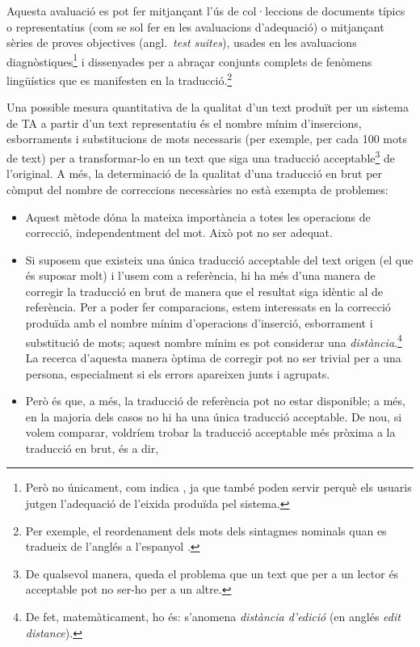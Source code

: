 \begin{enumerate}
\begin{enumerate}
  Aquesta avaluació es pot fer mitjançant
  l'ús de col·leccions de documents típics o representatius 
  (com se sol
  fer en les avaluacions d'adequació) o mitjançant sèries de
  proves objectives (angl.\ \emph{test suites}),   
  usades en les avaluacions diagnòstiques\footnote{Però no
    únicament, com indica  \citet{lewis97j}, ja que també poden
    servir perquè els usuaris jutgen l'adequació de l'eixida
    produïda pel sistema.} i dissenyades per a
  abraçar conjunts complets de fenòmens lingüístics que 
  es manifesten en la traducció.\footnote{Per exemple, el reordenament
  dels mots dels sintagmes nominals quan es tradueix de l'anglés
  a l'espanyol \citep{mira98j,forcada00p}.}

Una possible mesura quantitativa de la qualitat d'un text produït per
un sistema de TA a partir d'un text representatiu és el nombre mínim
d'insercions, esborraments i substitucions de mots necessaris (per
exemple, per cada 100 mots de text) per a transformar-lo en un text
que siga una traducció acceptable\footnote{De qualsevol manera, queda
  el problema que un text que per a un lector és acceptable pot no
  ser-ho per a un altre.} de l'original. A més, la determinació de la
qualitat d'una traducció en brut per còmput del nombre de correccions
necessàries no està exempta de problemes:
\begin{itemize}
\item Aquest mètode dóna la mateixa importància a totes les operacions
  de correcció, independentment del mot. Això pot no ser adequat.
\item Si suposem que existeix una única traducció acceptable del text
  origen (el que és suposar molt) i l'usem com a referència, hi ha més
  d'una manera de corregir la traducció en brut de manera que el
  resultat siga idèntic al de referència. Per a poder fer
  comparacions, estem interessats en la correcció produïda amb el
  nombre mínim d'operacions d'inserció, esborrament i substitució de
  mots; aquest nombre mínim es pot considerar una
  \emph{distància}.\footnote{De fet, matemàticament, ho és: s'anomena
    \emph{distància d'edició} (en anglés \emph{edit distance}).} La
  recerca d'aquesta manera òptima de corregir pot no ser trivial per a
  una persona, especialment si els errors apareixen junts i agrupats.
\item Però és que, a més, la traducció de referència pot no estar
  disponible; a més, en la majoria dels casos no hi ha una única
  traducció acceptable. De nou, si volem comparar, voldríem trobar la
  traducció acceptable més pròxima a la traducció en brut, és a dir,

\end{itemize}
\end{enumerate}
\end{enumerate}
